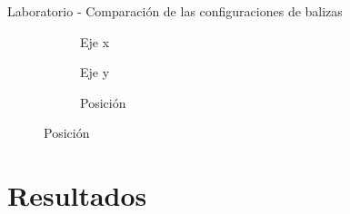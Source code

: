 \documentclass[xcolor=table]{beamer}
\begin{document}
  \begin{frame}{Laboratorio - Comparación de las configuraciones de balizas}
    \begin{figure}[H]
      \centering
        \begin{subfigure}[b]{.3\textwidth}
          \centering
          \hspace*{-0.8cm}
           
          \vspace*{-0.5cm}
          \caption{Eje x}
          \label{fig:boxplot_lab_x}
        \end{subfigure}
        \hspace*{0.1cm}
        \begin{subfigure}[b]{.3\textwidth}
          \centering
            
          \vspace*{-0.5cm}
          \caption{Eje y}
          \label{fig:boxplot_lab_y}
        \end{subfigure}
        \hspace*{0.1cm}
        \begin{subfigure}[b]{.3\textwidth}
            \centering
              
            \caption{Posición}
            \label{fig:boxplot_lab_pos}
          \end{subfigure}
        \label{fig:boxplot_lab}
    \end{figure}
  \end{frame}
  

  \section[Edificio de Física]{Resultados}
\end{document}
